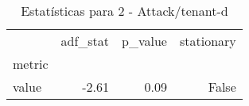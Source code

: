 \begin{table}[htbp]
\caption{Estatísticas para 2 - Attack/tenant-d}
\label{tab:2_-_attack_tenant-d_adf_test}
\begin{tabular}{lrrr}
\toprule
 & adf_stat & p_value & stationary \\
metric &  &  &  \\
\midrule
value & -2.61 & 0.09 & False \\
\bottomrule
\end{tabular}
\end{table}
